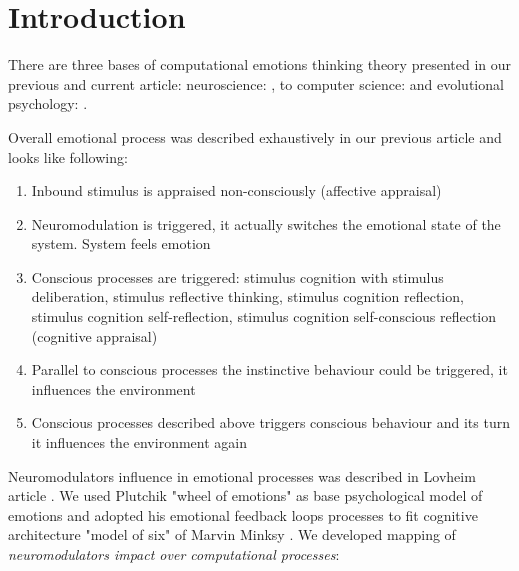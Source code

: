 \section{Introduction}

There are three bases of computational emotions thinking theory presented in our previous\cite{computational_emotional_thinking} and current article: neuroscience: \cite{emotionsbraintorobot, parsingreward, neuromodulatory, cubeofemotions, natureofemotions}, to computer science: \cite{emotionandsociable, senticcomputing, hourglass, affectivemodelofinterplay, affectivecomputing, computationalmodelsemotion, computationalmodelsemotionscognition, evaluatingcomutationalmodel, threelevel} and evolutional psychology: \cite{natureofemotions, primer_affect_psychology, tomkins1, tomkins2, tomkins3, tomkins4}.

Overall emotional process was described exhaustively in our previous article \cite{computational_emotional_thinking} and looks like following:

\begin{enumerate}
	\item  Inbound stimulus is appraised non-consciously (affective appraisal)
	\item  Neuromodulation is triggered, it actually switches the emotional state of the system. System feels emotion
	\item  Conscious processes are triggered: stimulus cognition with stimulus deliberation, stimulus reflective thinking, stimulus cognition reflection, stimulus cognition self-reflection, stimulus cognition self-conscious reflection (cognitive appraisal)
	\item  Parallel to conscious processes the instinctive behaviour could be triggered, it influences the environment
	\item  Conscious processes described above triggers conscious behaviour and its turn it influences the environment again
\end{enumerate}

Neuromodulators influence in emotional processes was described in Lovheim article \cite{cubeofemotions}. We used Plutchik "wheel of emotions" as base psychological model of emotions \cite{natureofemotions} and adopted his emotional feedback loops processes to fit cognitive architecture "model of six" of Marvin Minksy \cite{emotionmachine}. We developed mapping of \emph{neuromodulators impact over computational processes}:

